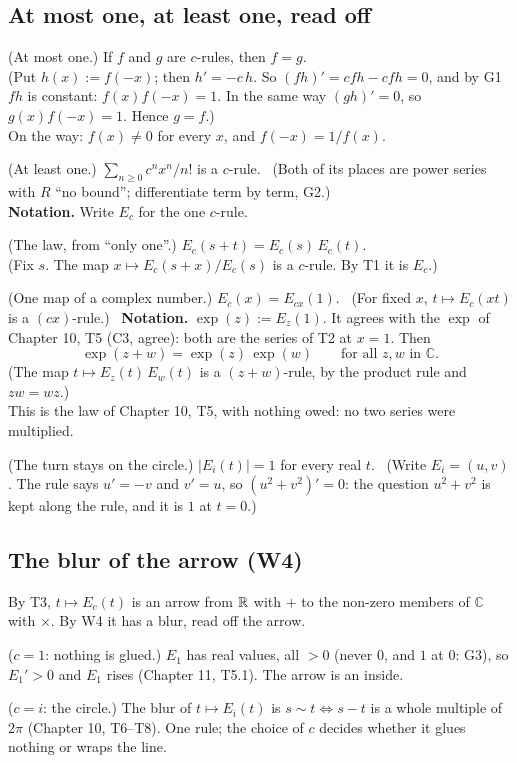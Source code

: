 \subsection*{At most one, at least one, read off}

\begin{lines}
\item[\lab{T1}] (At most one.) If $f$ and $g$ are $c$-rules, then $f = g$. \\
(Put $h(x) := f(-x)$; then $h' = -c\,h$. So $(f h)' = c f h - c f h = 0$, and by G1 $f h$ is constant: $f(x) f(-x) = 1$. In the same way $(g h)' = 0$, so $g(x) f(-x) = 1$. Hence $g = f$.) \\
On the way: $f(x) \neq 0$ for every $x$, and $f(-x) = 1/f(x)$.
\item[\lab{T2}] (At least one.) $\sum_{n \ge 0} c^n x^n / n!$ is a $c$-rule. \ (Both of its places are power series with $R$ ``no bound''; differentiate term by term, G2.) \\ \textbf{Notation.} Write $E_c$ for the one $c$-rule.
\item[\lab{T3}] (The law, from ``only one''.) $E_c(s + t) = E_c(s)\,E_c(t)$. \\
(Fix $s$. The map $x \mapsto E_c(s + x)/E_c(s)$ is a $c$-rule. By T1 it is $E_c$.)
\item[\lab{T4}] (One map of a complex number.) $E_c(x) = E_{c x}(1)$. \ (For fixed $x$, $t \mapsto E_c(x t)$ is a $(c x)$-rule.) \ \textbf{Notation.} $\exp(z) := E_z(1)$. It agrees with the $\exp$ of Chapter 10, T5 (C3, agree): both are the series of T2 at $x = 1$. Then
\[
\exp(z + w) = \exp(z)\,\exp(w) \qquad\text{for all } z, w \text{ in } \mathbb{C}.
\]
(The map $t \mapsto E_z(t)\,E_w(t)$ is a $(z + w)$-rule, by the product rule and $z w = w z$.) \\
This is the law of Chapter 10, T5, with nothing owed: no two series were multiplied.
\item[\lab{T5}] (The turn stays on the circle.) $|E_i(t)| = 1$ for every real $t$. \ (Write $E_i = (u, v)$. The rule says $u' = -v$ and $v' = u$, so $(u^2 + v^2)' = 0$: the question $u^2 + v^2$ is kept along the rule, and it is $1$ at $t = 0$.)
\end{lines}

\subsection*{The blur of the arrow (W4)}

\begin{lines}
\item[\lab{P1}] By T3, $t \mapsto E_c(t)$ is an arrow from $\mathbb{R}$ with $+$ to the non-zero members of $\mathbb{C}$ with $\times$. By W4 it has a blur, read off the arrow.
\item[\lab{P2}] ($c = 1$: nothing is glued.) $E_1$ has real values, all $> 0$ (never $0$, and $1$ at $0$: G3), so $E_1' > 0$ and $E_1$ rises (Chapter 11, T5.1). The arrow is an inside.
\item[\lab{P3}] ($c = i$: the circle.) The blur of $t \mapsto E_i(t)$ is $s \sim t \iff s - t$ is a whole multiple of $2\pi$ (Chapter 10, T6--T8). One rule; the choice of $c$ decides whether it glues nothing or wraps the line.
\end{lines}

